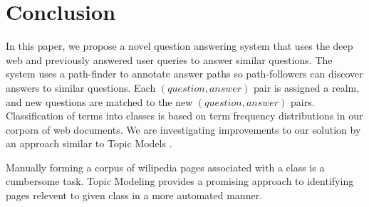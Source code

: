 \section{Conclusion}

In this paper, we propose a novel question answering system that uses the deep web and previously answered user queries to answer similar questions. The system uses a path-finder to annotate answer paths so path-followers can discover answers to similar questions.  Each $(question, answer)$ pair is assigned a realm, and new questions are matched to the new $(question, answer)$ pairs. Classification of terms into classes is based on term frequency distributions in our corpora of web documents. We are investigating improvements to our solution by an approach similar to Topic Models \cite{Blei2003latentdirichlet}. 

Manually forming a corpus of wilipedia pages associated with a class is a cumbersome task. Topic Modeling provides a promising approach to identifying pages relevent to given class in a more automated manner.
 


